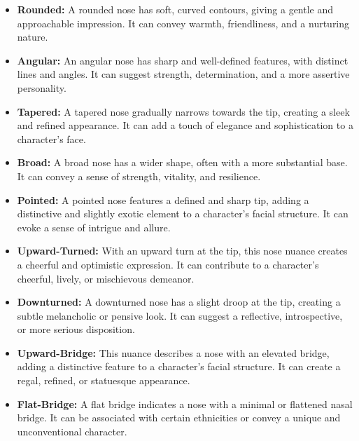 \documentclass[12pt]{book}  %
\begin{document}
\begin{itemize}
    \item \textbf{Rounded:} A rounded nose has soft, curved contours, giving a gentle and approachable impression. It can convey warmth, friendliness, and a nurturing nature.
    
    \item \textbf{Angular:} An angular nose has sharp and well-defined features, with distinct lines and angles. It can suggest strength, determination, and a more assertive personality.
    
    \item \textbf{Tapered:} A tapered nose gradually narrows towards the tip, creating a sleek and refined appearance. It can add a touch of elegance and sophistication to a character's face.
    
    \item \textbf{Broad:} A broad nose has a wider shape, often with a more substantial base. It can convey a sense of strength, vitality, and resilience.
    
    \item \textbf{Pointed:} A pointed nose features a defined and sharp tip, adding a distinctive and slightly exotic element to a character's facial structure. It can evoke a sense of intrigue and allure.
    
    \item \textbf{Upward-Turned:} With an upward turn at the tip, this nose nuance creates a cheerful and optimistic expression. It can contribute to a character's cheerful, lively, or mischievous demeanor.
    
    \item \textbf{Downturned:} A downturned nose has a slight droop at the tip, creating a subtle melancholic or pensive look. It can suggest a reflective, introspective, or more serious disposition.
    
    \item \textbf{Upward-Bridge:} This nuance describes a nose with an elevated bridge, adding a distinctive feature to a character's facial structure. It can create a regal, refined, or statuesque appearance.
    
    \item \textbf{Flat-Bridge:} A flat bridge indicates a nose with a minimal or flattened nasal bridge. It can be associated with certain ethnicities or convey a unique and unconventional character.
\end{itemize}
\end{document}
